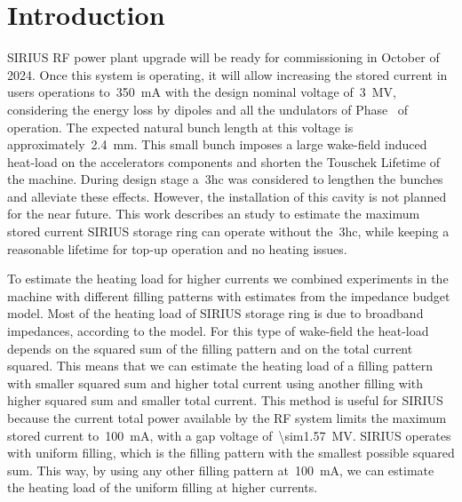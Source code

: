 \documentclass[a4paper,
               biblatex,     %
               ]{jacow}
\newcommand*{\rom}[1]{\uppercase\expandafter{\romannumeral#1\relax}}
\begin{document}
\section{Introduction}
    SIRIUS RF power plant upgrade will be ready for commissioning in October of 2024. Once this system is operating, it will allow increasing the stored current in users operations to~\SI{350}{\milli\ampere} with the design nominal voltage of~\SI{3}{\mega\volt}, considering the energy loss by dipoles and all the undulators of Phase~\rom{1} of operation. The expected natural bunch length at this voltage is approximately~\SI{2.4}{\milli\meter}. This small bunch imposes a large wake-field induced heat-load on the accelerators components and shorten the Touschek Lifetime of the machine. During design stage a~\gls{3hc} was considered to lengthen the bunches and alleviate these effects. However, the installation of this cavity is not planned for the near future. This work describes an study to estimate the maximum stored current SIRIUS storage ring can operate without the~\gls{3hc}, while keeping a reasonable lifetime for top-up operation and no heating issues.

    To estimate the heating load for higher currents we combined experiments in the machine with different filling patterns with estimates from the impedance budget model. Most of the heating load of SIRIUS storage ring is due to broadband impedances, according to the model. For this type of wake-field the heat-load depends on the squared sum of the filling pattern and on the total current squared. This means that we can estimate the heating load of a filling pattern with smaller squared sum and higher total current using another filling with higher squared sum and smaller total current. This method is useful for SIRIUS because the current total power available by the RF system limits the maximum stored current to~\SI{100}{\milli\ampere}, with a gap voltage of~\SI{\sim1.57}{\mega\volt}. SIRIUS operates with uniform filling, which is the filling pattern with the smallest possible squared sum. This way, by using any other filling pattern at~\SI{100}{\milli\ampere}, we can estimate the heating load of the uniform filling at higher currents.
\end{document}
